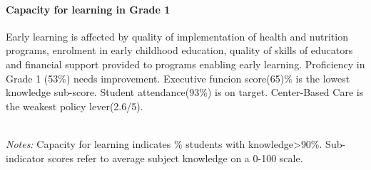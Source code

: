 \documentclass[
  twocolumn]{article}
\begin{document}
\hypertarget{capacity-for-learning-in-grade-1}{%
\paragraph{\texorpdfstring{\textbf{Capacity for learning in Grade
1}}{Capacity for learning in Grade 1}}\label{capacity-for-learning-in-grade-1}}

Early learning is affected by quality of implementation of health and
nutrition programs, enrolment in early childhood education, quality of
skills of educators and financial support provided to programs enabling
early learning. Proficiency in Grade 1 (53\%) needs improvement.
Executive funcion score(65)\% is the lowest knowledge sub-score. Student
attendance(93\%) is on target. Center-Based Care is the weakest policy
lever(2.6/5).

\begin{table}[H]
\\
\color{darkgray}\scriptsize{\textit{Notes:} Capacity for learning indicates \% students with knowledge\textgreater{90\%}. Sub-indicator scores refer to average subject knowledge on a 0-100 scale.}
\end{table}
\raggedbottom
\end{document}

